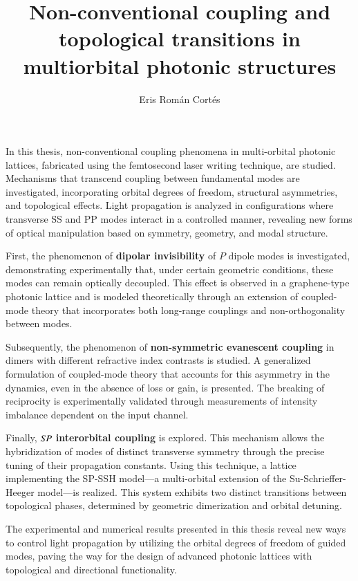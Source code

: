 \documentclass[english, hyphens]{umemoria}
\author{Eris Román Cortés}
\title{Non-conventional coupling and topological transitions in multiorbital photonic structures}
\begin{document}
\frontmatter
\maketitle

\begin{resumen}\ignorespacesafterend
	In this thesis, non-conventional coupling phenomena in multi-orbital photonic lattices, fabricated using the femtosecond laser writing technique, are studied. Mechanisms that transcend coupling between fundamental modes are investigated, incorporating orbital degrees of freedom, structural asymmetries, and topological effects. Light propagation is analyzed in configurations where transverse SS and PP modes interact in a controlled manner, revealing new forms of optical manipulation based on symmetry, geometry, and modal structure.
	
	First, the phenomenon of \textbf{dipolar invisibility} of $P$ dipole modes is investigated, demonstrating experimentally that, under certain geometric conditions, these modes can remain optically decoupled. This effect is observed in a graphene-type photonic lattice and is modeled theoretically through an extension of coupled-mode theory that incorporates both long-range couplings and non-orthogonality between modes.
	
	Subsequently, the phenomenon of \textbf{non-symmetric evanescent coupling} in dimers with different refractive index contrasts is studied. A generalized formulation of coupled-mode theory that accounts for this asymmetry in the dynamics, even in the absence of loss or gain, is presented. The breaking of reciprocity is experimentally validated through measurements of intensity imbalance dependent on the input channel.
	
	Finally, \( S\hspace{-0.3ex}P \) \textbf{interorbital coupling} is explored. This mechanism allows the hybridization of modes of distinct transverse symmetry through the precise tuning of their propagation constants. Using this technique, a lattice implementing the SP-SSH model—a multi-orbital extension of the Su-Schrieffer-Heeger model—is realized. This system exhibits two distinct transitions between topological phases, determined by geometric dimerization and orbital detuning.
	
	The experimental and numerical results presented in this thesis reveal new ways to control light propagation by utilizing the orbital degrees of freedom of guided modes, paving the way for the design of advanced photonic lattices with topological and directional functionality.
\end{resumen}
\end{document}
